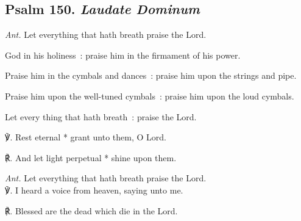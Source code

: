 \subsection{Psalm 150. \textit{Laudate Dominum}}\par\noindent
\textit{Ant.} Let everything that hath breath {\dag} praise the Lord.\par
{} God in his holiness~: praise him in the firmament of his power.\par
{}
Praise him in the cymbals and dances~: praise him upon the strings and pipe.\par
{}Praise him upon the well-tuned cymbals~: praise him upon the loud cymbals.\par
{}Let every thing that hath breath~: praise the Lord.\par
℣. Rest eternal * grant unto them, O Lord.\par
℟. And let light perpetual * shine upon them.\par\noindent
\textit{Ant.} Let everything that hath breath praise the Lord.\\

℣. I heard a voice from heaven, saying unto me.\par
℟. Blessed are the dead which die in the Lord.

\clearpage
